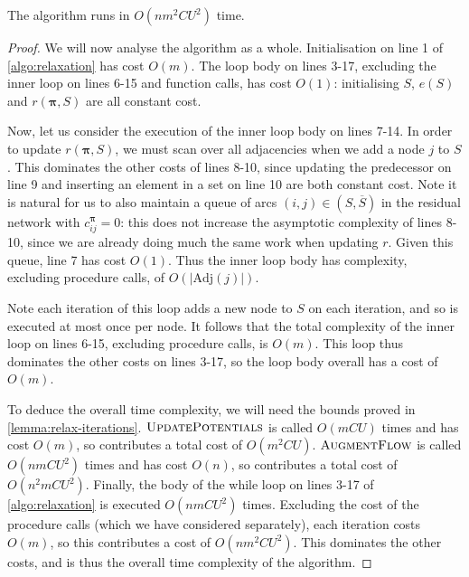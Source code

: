 \begin{thm} The algorithm runs in $O(nm^2CU^2)$ time.
\end{thm}
\begin{proof}
We will now analyse the algorithm as a whole. Initialisation on line 1 of \cref{algo:relaxation} has cost $O(m)$. The loop body on lines 3-17, excluding the inner loop on lines 6-15 and function calls, has cost $O(1)$: initialising $S$, $e(S)$ and $r(\boldsymbol{\pi},S)$ are all constant cost.

Now, let us consider the execution of the inner loop body on lines 7-14. In order to update $r(\boldsymbol{\pi},S)$, we must scan over all adjacencies when we add a node $j$ to $S$. This dominates the other costs of lines 8-10, since updating the predecessor on line 9 and inserting an element in a set on line 10 are both constant cost. Note it is natural for us to also maintain a queue of arcs $(i,j) \in \left(S,\overline{S}\right)$ in the residual network with $c_{ij}^{\boldsymbol{\pi}}=0$: this does not increase the asymptotic complexity of lines 8-10, since we are already doing much the same work when updating $r$. Given this queue, line 7 has cost $O(1)$. Thus the inner loop body has complexity, excluding procedure calls, of $O\left(\left|\mathrm{Adj}(j)\right|\right)$\footnotemark.

Note each iteration of this loop adds a new node to $S$ on each iteration, and so is executed at most once per node. It follows that the total complexity of the inner loop on lines 6-15, excluding procedure calls, is $O(m)$. This loop thus dominates the other costs on lines 3-17, so the loop body overall has a cost of $O(m)$.

To deduce the overall time complexity, we will need the bounds proved in \cref{lemma:relax-iterations}. $\textproc{UpdatePotentials}$ is called $O(mCU)$ times and has cost $O(m)$, so contributes a total cost of $O(m^2CU)$. $\textproc{AugmentFlow}$ is called $O(nmCU^2)$ times and has cost $O(n)$, so contributes a total cost of $O(n^2mCU^2)$. Finally, the body of the while loop on lines 3-17 of \cref{algo:relaxation} is executed $O(nmCU^2)$ times. Excluding the cost of the procedure calls (which we have considered separately), each iteration costs $O(m)$, so this contributes a cost of $O(nm^2CU^2)$. This dominates the other costs, and is thus the overall time complexity of the algorithm.
\end{proof}

